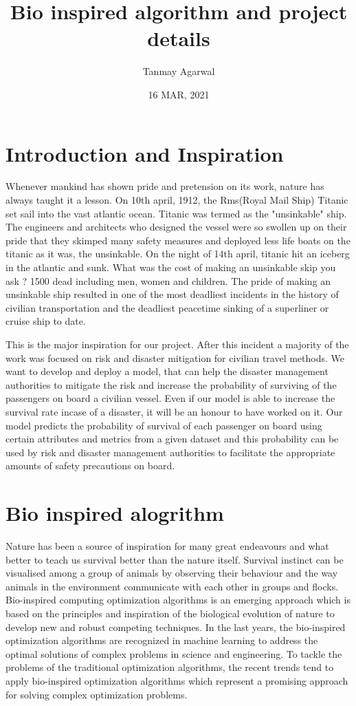 \documentclass{article}
\newcommand{\nd}{\noindent}
\begin{document}
\title{Bio inspired algorithm and project details}
\author{Tanmay Agarwal} 
\date{16 MAR, 2021}
\maketitle 
\tableofcontents
\section{Introduction and Inspiration}
Whenever mankind has shown pride and pretension on its work, nature has always taught it a lesson. On 10th april, 1912, the Rms(Royal Mail Ship) Titanic set sail into the vast atlantic ocean. Titanic was termed as the "unsinkable" ship. The engineers and architects who designed the vessel were so swollen up on their pride that they skimped many safety measures and deployed less life boats on the titanic as it was, the unsinkable. On the night of 14th april, titanic hit an iceberg in the atlantic and sunk. What was the cost of making an unsinkable skip you ask ? 1500 dead including men, women and children. The pride of making an unsinkable ship resulted in one of the most deadliest incidents in the history of civilian transportation and the deadliest peacetime sinking of a superliner or cruise ship to date. 

\nd This is the major inspiration for our project. After this incident a majority of the work was focused on risk and disaster mitigation for civilian travel methods. We want to develop and deploy a model, that can help the disaster management authorities to mitigate the risk and increase the probability of surviving of the passengers on board a civilian vessel. Even if our model is able to increase the survival rate incase of a disaster, it will be an honour to have worked on it. Our model predicts the probability of survival of each passenger on board using certain attributes and metrics from a given dataset and this probability can be used by risk and disaster management authorities to facilitate the appropriate amounts of safety precautions on board. 

\section{Bio inspired alogrithm} 
Nature has been a source of inspiration for many great endeavours and what better to teach us survival better than the nature itself. Survival instinct can be visualised among a group of animals by observing their behaviour and the way animals in the environment communicate with each other in groups and flocks. Bio-inspired computing optimization algorithms is an emerging approach which is based on the principles and inspiration of the biological evolution of nature to develop new and robust competing techniques. In the last years, the bio-inspired optimization algorithms are recognized in machine learning to address the optimal solutions of complex problems in science and engineering. To tackle the problems of the traditional optimization algorithms, the recent trends tend to apply bio-inspired optimization algorithms which represent a promising approach for solving complex optimization problems.
\end{document}
